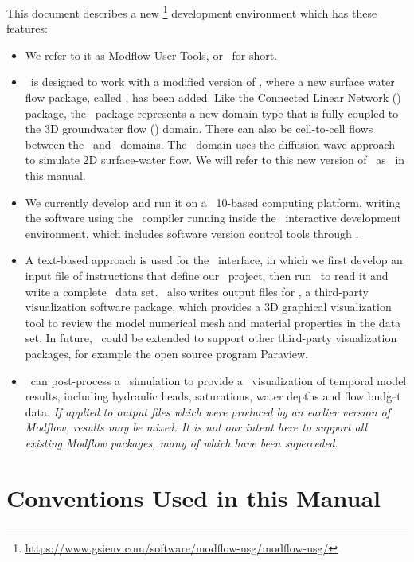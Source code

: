 \label{chapter:Introduction} This document describes a new \mfu\footnote{\url{https://www.gsienv.com/software/modflow-usg/modflow-usg/}}  development environment which has these features:
\begin{itemize}
    \item We refer to it as Modflow User Tools, or \mut\ for short.
    \item \mut\ is designed to work with a modified version of \mfu,  where a new surface water flow package, called \swf, has been added. Like the Connected Linear Network (\cln) package, the \swf\ package represents a new domain type that is fully-coupled to the 3D groundwater flow (\gwf) domain. There can also be cell-to-cell flows between the \swf\ and \cln\ domains.  The \swf\ domain uses the diffusion-wave approach to simulate 2D surface-water flow. We will refer to this new version of \mfu\ as \mfus\ in this manual.
    \item We currently develop and run it on a \windows\ 10-based computing platform, writing the software using the \ifort\ compiler running inside the \vstudio\ interactive development environment, which includes software version control tools through \github.
    \item A text-based approach is used for the \mut\ interface, in which we first develop an input file of instructions that define our \mfus\ project,  then run \mut\ to read it and write a complete \mfus\ data set. \mut\ also writes output files for \tecplot, a third-party visualization software package, which provides a 3D graphical visualization tool to review the model numerical mesh and material properties in the data set. In future, \mut\ could be extended to support other third-party visualization packages, for example the open source program Paraview.
    \item \mut\ can post-process a \mfus\ simulation to provide a \tecplot\ visualization of temporal model results, including hydraulic heads, saturations, water depths and flow budget data.  \textit{If applied to output files which were produced by an earlier version of Modflow, results may be mixed.  It is not our intent here to support all existing Modflow packages, many of which have been superceded.}
\end{itemize}


\section{Conventions Used in this Manual} \label{section:AboutManual}

